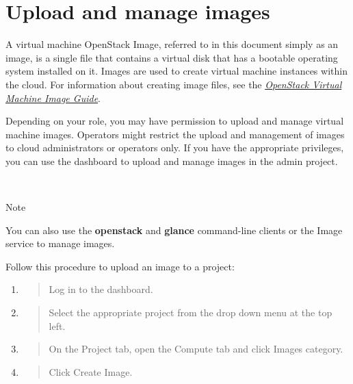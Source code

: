 \chapter{Upload and manage images}

A virtual machine \gls{OpenStack Image}, referred to in this document simply as an
image, is a single file that contains a virtual disk that has a bootable
operating system installed on it. Images are used to create virtual
machine instances within the cloud. For information about creating image
files, see the
\href{https://docs.openstack.org/image-guide/}{\emph{OpenStack Virtual
Machine Image Guide}}.

Depending on your role, you may have permission to upload and manage
virtual machine images. Operators might restrict the upload and
management of images to cloud administrators or operators only. If you
have the appropriate privileges, you can use the dashboard to upload and
manage images in the admin project.

~

Note

You can also use the \textbf{openstack} and \textbf{glance} command-line
clients or the Image service to manage images.


Follow this procedure to upload an image to a project:

\begin{enumerate}
\def\labelenumi{\arabic{enumi}.}
\item
  \begin{quote}
  Log in to the dashboard.
  \end{quote}
\item
  \begin{quote}
  Select the appropriate project from the drop down menu at the top
  left.
  \end{quote}
\item
  \begin{quote}
  On the Project tab, open the Compute tab and click Images category.
  \end{quote}
\item
  \begin{quote}
  Click Create Image.
  \end{quote}
\end{enumerate}

